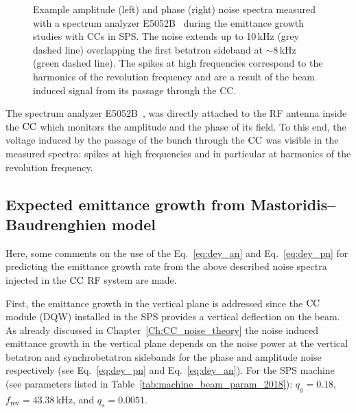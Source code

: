 \begin{figure}[!ht]
\begin{subfigure}[t]{0.45\textwidth}
   \end{subfigure}
   \hfill
    \caption{Example amplitude (left) and phase (right) noise spectra measured with a spectrum analyzer E5052B~\cite{E5052B_insight} during the emittance growth studies with CCs in SPS. The noise extends up to 10\,kHz (grey dashed line) overlapping the first betatron sideband at $\sim$8\,kHz (green dashed line). The spikes at high frequencies correspond to the harmonics of the revolution frequency and are a result of the beam induced signal from its passage through the CC.} %
    \label{fig:example_PN_and_AN_coast1_setting2}
\end{figure}

The spectrum analyzer E5052B~\cite{E5052B_insight},  was directly attached to the RF antenna inside the ${\mathrm{CC}}$ which monitors the amplitude and the phase of its field. To this end, the voltage induced by the passage of the bunch through the ${\mathrm{CC}}$ was visible in the measured spectra: spikes at high frequencies and in particular at harmonics of the revolution frequency.


\subsection{Expected emittance growth from Mastoridis--Baudrenghien model}\label{subsec:expected_emitGrowth_2018}
Here, some comments on the use of the Eq.~\eqref{eq:dey_an} and Eq.~\eqref{eq:dey_pn} for predicting the emittance growth rate from the above described noise spectra injected in the ${\mathrm{CC}}$ RF system are made.

First, the emittance growth in the vertical plane is addressed since the ${\mathrm{CC}}$ module (DQW) installed in the SPS provides a vertical deflection on the beam. As already discussed in Chapter~\ref{Ch:CC_noise_theory} the noise induced emittance growth in the vertical plane depends on the noise power at the vertical betatron and synchrobetatron sidebands for the phase and amplitude noise respectively (see Eq.~\eqref{eq:dey_pn} and Eq.~\eqref{eq:dey_an}). For the SPS machine (see parameters listed in Table~\ref{tab:machine_beam_param_2018}): $q_y=0.18$, $f_\mathrm{rev}=43.38$\,kHz, and $q_s=0.0051$. 

